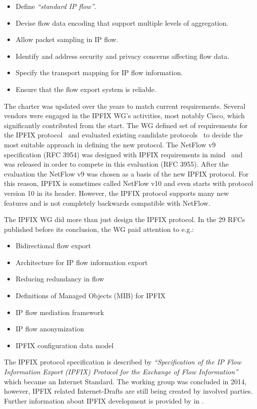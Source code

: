 \begin{itemize}
    \item Define \emph{``standard IP flow''}.
    \item Devise flow data encoding that support multiple levels of aggregation.
    \item Allow packet sampling in IP flow.
    \item Identify and address security and privacy concerns affecting flow data.
    \item Specify the transport mapping for IP flow information.
    \item Ensure that the flow export system is reliable.
\end{itemize}

The charter was updated over the years to match current requirements. Several vendors were engaged in the IPFIX WG’s activities, most notably Cisco, which significantly contributed from the start. The WG defined set of requirements for the IPFIX protocol~\cite{rfc3917} and evaluated existing candidate protocols~\cite{rfc3955} to decide the most suitable approach in defining the new protocol. The NetFlow v9 specification (RFC 3954) was designed with IPFIX requirements in mind~\cite{Trammell-2011-Introduction} and was released in order to compete in this evaluation (RFC 3955). After the evaluation the NetFlow v9 was chosen as a basis of the new IPFIX protocol. For this reason, IPFIX is sometimes called NetFlow v10 and even starts with protocol version 10 in its header. However, the IPFIX protocol supports many new features and is not completely backwards compatible with NetFlow.

The IPFIX WG did more than just design the IPFIX protocol. In the 29 RFCs published before its conclusion, the WG paid attention to e.g.:
\begin{itemize}
    \item Bidirectional flow export~\cite{rfc5103}
    \item Architecture for IP flow information export~\cite{rfc5470}
    \item Reducing redundancy in flow~\cite{rfc5473}
    \item Definitions of Managed Objects (MIB) for IPFIX~\cite{rfc5815, rfc6615, rfc8038}
    \item IP flow mediation framework~\cite{rfc5982, rfc6183}
    \item IP flow anonymization~\cite{rfc6235}
    \item IPFIX configuration data model~\cite{rfc6728}
\end{itemize}
The IPFIX protocol specification is described by \emph{``Specification of the IP Flow Information Export (IPFIX) Protocol for the Exchange of Flow Information''}~\cite{rfc7011} which became an Internet Standard. The working group was concluded in 2014, however, IPFIX related Internet-Drafts are still being created by involved parties. Further information about IPFIX development is provided by \citeauthor{Brownlee-2011-Flow} in \cite{Brownlee-2011-Flow}.

